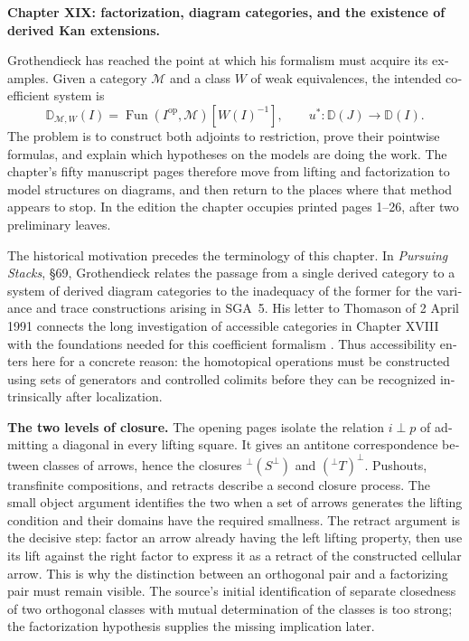 \begin{otherlanguage}{english}
\begingroup
{}
\noindent\textbf{Chapter XIX: factorization, diagram categories, and the existence of derived Kan extensions.}



\medskip
Grothendieck has reached the point at which his formalism must acquire its
examples. Given a category $\mathcal M$ and a class $W$ of weak equivalences,
the intended coefficient system is
\[
 \mathbb D_{\mathcal M,W}(I)
   =\operatorname{Fun}(I^{\mathrm{op}},\mathcal M)[W(I)^{-1}],
 \qquad u^*:\mathbb D(J)\longrightarrow\mathbb D(I).
\]
The problem is to construct both adjoints to restriction, prove their pointwise
formulas, and explain which hypotheses on the models are doing the work. The
chapter's fifty manuscript pages therefore move from lifting and factorization
to model structures on diagrams, and then return to the places where that
method appears to stop. In the edition the chapter occupies printed pages 1--26,
after two preliminary leaves.

The historical motivation precedes the terminology of this chapter. In
\emph{Pursuing Stacks}, \S69, Grothendieck relates the passage from a single
derived category to a system of derived diagram categories to the inadequacy
of the former for the variance and trace constructions arising in SGA~5.
His letter to Thomason of 2 April 1991 connects the long investigation of
accessible categories in Chapter XVIII with the foundations needed for this
coefficient formalism \citep{Grothendieck1983,Grothendieck1991Letter}. Thus
accessibility enters here for a concrete reason: the homotopical operations
must be constructed using sets of generators and controlled colimits before
they can be recognized intrinsically after localization.

\noindent\textbf{The two levels of closure.}
The opening pages isolate the relation $i\mathbin{\perp}p$ of admitting a
diagonal in every lifting square. It gives an antitone correspondence between
classes of arrows, hence the closures
${}^{\perp}(S^{\perp})$ and $({}^{\perp}T)^{\perp}$. Pushouts, transfinite
compositions, and retracts describe a second closure process. The small
object argument identifies the two when a set of arrows generates the
lifting condition and their domains have the required smallness. The
retract argument is the decisive step: factor an arrow already having the
left lifting property, then use its lift against the right factor to express
it as a retract of the constructed cellular arrow. This is why the distinction
between an orthogonal pair and a factorizing pair must remain visible.
The source's initial identification of separate closedness of two orthogonal
classes with mutual determination of the classes is too strong; the
factorization hypothesis supplies the missing implication later.


\end{otherlanguage}
